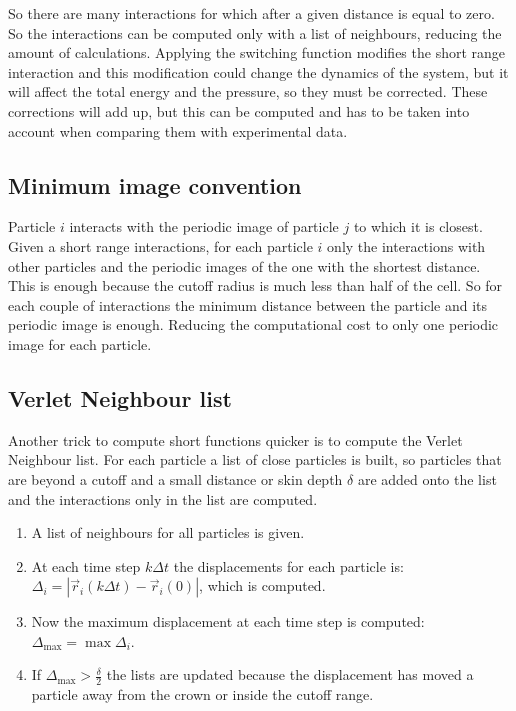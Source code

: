 	So there are many interactions for which after a given distance is equal to zero.
	So the interactions can be computed only with a list of neighbours, reducing the amount of calculations.
	Applying the switching function modifies the short range interaction and this modification could change the dynamics of the system, but it will affect the total energy and the pressure, so they must be corrected.
	These corrections will add up, but this can be computed and has to be taken into account when comparing them with experimental data.

	\subsection{Minimum image convention}
	Particle $i$ interacts with the periodic image of particle $j$ to which it is closest.
	Given a short range interactions, for each particle $i$ only the interactions with other particles and the periodic images of the one with the shortest distance.
	This is enough because the cutoff radius is much less than half of the cell.
	So for each couple of interactions the minimum distance between the particle and its periodic image is enough.
	Reducing the computational cost to only one periodic image for each particle.

	\subsection{Verlet Neighbour list}
	Another trick to compute short functions quicker is to compute the Verlet Neighbour list.
	For each particle a list of close particles is built, so particles that are beyond a cutoff and a small distance or skin depth $\delta$ are added onto the list and the interactions only in the list are computed.

	\begin{multicols}{2}
		\begin{enumerate}
			\item A list of neighbours for all particles is given.
			\item At each time step $k\Delta t$ the displacements for each particle is: $\Delta_i = |\vec{r}_i(k\Delta t) - \vec{r}_i(0)|$, which is computed.
			\item Now the maximum displacement at each time step is computed: $\Delta_{\max} = \max\Delta_i$.
			\item If $\Delta_{\max} > \frac{\delta}{2}$ the lists are updated because the displacement has moved a particle away from the crown or inside the cutoff range.
		\end{enumerate}
	\end{multicols}

